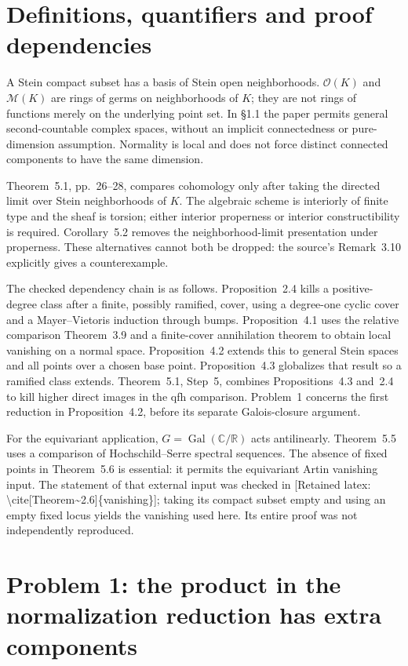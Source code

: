 \documentclass[10pt]{article}
\begin{document}
\section*{Definitions, quantifiers and proof dependencies}
A Stein compact subset has a basis of Stein open neighborhoods. \(\mathcal O(K)\) and \(\mathcal M(K)\) are rings of germs on neighborhoods of \(K\); they are not rings of functions merely on the underlying point set. In §1.1 the paper permits general second-countable complex spaces, without an implicit connectedness or pure-dimension assumption. Normality is local and does not force distinct connected components to have the same dimension.\par
Theorem 5.1, pp. 26–28, compares cohomology only after taking the directed limit over Stein neighborhoods of \(K\). The algebraic scheme is interiorly of finite type and the sheaf is torsion; either interior properness or interior constructibility is required. Corollary 5.2 removes the neighborhood-limit presentation under properness. These alternatives cannot both be dropped: the source’s Remark 3.10 explicitly gives a counterexample.\par
The checked dependency chain is as follows. Proposition 2.4 kills a positive-degree class after a finite, possibly ramified, cover, using a degree-one cyclic cover and a Mayer–Vietoris induction through bumps. Proposition 4.1 uses the relative comparison Theorem 3.9 and a finite-cover annihilation theorem to obtain local vanishing on a normal space. Proposition 4.2 extends this to general Stein spaces and all points over a chosen base point. Proposition 4.3 globalizes that result so a ramified class extends. Theorem 5.1, Step 5, combines Propositions 4.3 and 2.4 to kill higher direct images in the qfh comparison. Problem 1 concerns the first reduction in Proposition 4.2, before its separate Galois-closure argument.\par
For the equivariant application, \(G=\operatorname{Gal}(\mathbb C/\mathbb R)\) acts antilinearly. Theorem 5.5 uses a comparison of Hochschild–Serre spectral sequences. The absence of fixed points in Theorem 5.6 is essential: it permits the equivariant Artin vanishing input. The statement of that external input was checked in [Retained latex: \textbackslash{}cite[Theorem\textasciitilde{}2.6]\{vanishing\}]; taking its compact subset empty and using an empty fixed locus yields the vanishing used here. Its entire proof was not independently reproduced.\par
\section*{Problem 1: the product in the normalization reduction has extra components}
\end{document}
